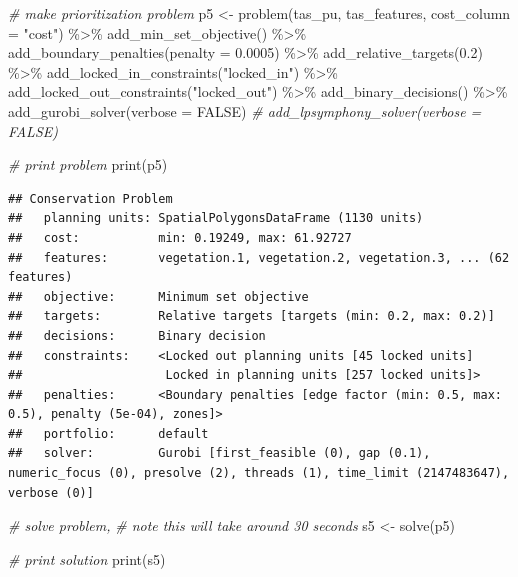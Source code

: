 \documentclass[
  12pt,
]{book}
\newenvironment{Shaded}{\begin{snugshade}}{\end{snugshade}}
\newcommand{\AttributeTok}[1]{\textcolor[rgb]{0.77,0.63,0.00}{#1}}
\newcommand{\CommentTok}[1]{\textcolor[rgb]{0.56,0.35,0.01}{\textit{#1}}}
\newcommand{\ConstantTok}[1]{\textcolor[rgb]{0.00,0.00,0.00}{#1}}
\newcommand{\FloatTok}[1]{\textcolor[rgb]{0.00,0.00,0.81}{#1}}
\newcommand{\FunctionTok}[1]{\textcolor[rgb]{0.00,0.00,0.00}{#1}}
\newcommand{\NormalTok}[1]{#1}
\newcommand{\OtherTok}[1]{\textcolor[rgb]{0.56,0.35,0.01}{#1}}
\newcommand{\SpecialCharTok}[1]{\textcolor[rgb]{0.00,0.00,0.00}{#1}}
\newcommand{\StringTok}[1]{\textcolor[rgb]{0.31,0.60,0.02}{#1}}
\begin{document}
\begin{Shaded}
\begin{Highlighting}[]
\CommentTok{\# make prioritization problem}
\NormalTok{p5 }\OtherTok{\textless{}{-}} \FunctionTok{problem}\NormalTok{(tas\_pu, tas\_features, }\AttributeTok{cost\_column =} \StringTok{"cost"}\NormalTok{) }\SpecialCharTok{\%\textgreater{}\%}
      \FunctionTok{add\_min\_set\_objective}\NormalTok{() }\SpecialCharTok{\%\textgreater{}\%}
      \FunctionTok{add\_boundary\_penalties}\NormalTok{(}\AttributeTok{penalty =} \FloatTok{0.0005}\NormalTok{) }\SpecialCharTok{\%\textgreater{}\%}
      \FunctionTok{add\_relative\_targets}\NormalTok{(}\FloatTok{0.2}\NormalTok{) }\SpecialCharTok{\%\textgreater{}\%}
      \FunctionTok{add\_locked\_in\_constraints}\NormalTok{(}\StringTok{"locked\_in"}\NormalTok{) }\SpecialCharTok{\%\textgreater{}\%}
      \FunctionTok{add\_locked\_out\_constraints}\NormalTok{(}\StringTok{"locked\_out"}\NormalTok{) }\SpecialCharTok{\%\textgreater{}\%}
      \FunctionTok{add\_binary\_decisions}\NormalTok{() }\SpecialCharTok{\%\textgreater{}\%}
      \FunctionTok{add\_gurobi\_solver}\NormalTok{(}\AttributeTok{verbose =} \ConstantTok{FALSE}\NormalTok{)}
      \CommentTok{\# add\_lpsymphony\_solver(verbose = FALSE)}

\CommentTok{\# print problem}
\FunctionTok{print}\NormalTok{(p5)}
\end{Highlighting}
\end{Shaded}

\begin{verbatim}
## Conservation Problem
##   planning units: SpatialPolygonsDataFrame (1130 units)
##   cost:           min: 0.19249, max: 61.92727
##   features:       vegetation.1, vegetation.2, vegetation.3, ... (62 features)
##   objective:      Minimum set objective 
##   targets:        Relative targets [targets (min: 0.2, max: 0.2)]
##   decisions:      Binary decision 
##   constraints:    <Locked out planning units [45 locked units]
##                    Locked in planning units [257 locked units]>
##   penalties:      <Boundary penalties [edge factor (min: 0.5, max: 0.5), penalty (5e-04), zones]>
##   portfolio:      default
##   solver:         Gurobi [first_feasible (0), gap (0.1), numeric_focus (0), presolve (2), threads (1), time_limit (2147483647), verbose (0)]
\end{verbatim}

\begin{Shaded}
\begin{Highlighting}[]
\CommentTok{\# solve problem,}
\CommentTok{\# note this will take around 30 seconds}
\NormalTok{s5 }\OtherTok{\textless{}{-}} \FunctionTok{solve}\NormalTok{(p5)}

\CommentTok{\# print solution}
\FunctionTok{print}\NormalTok{(s5)}
\end{Highlighting}
\end{Shaded}
\end{document}
